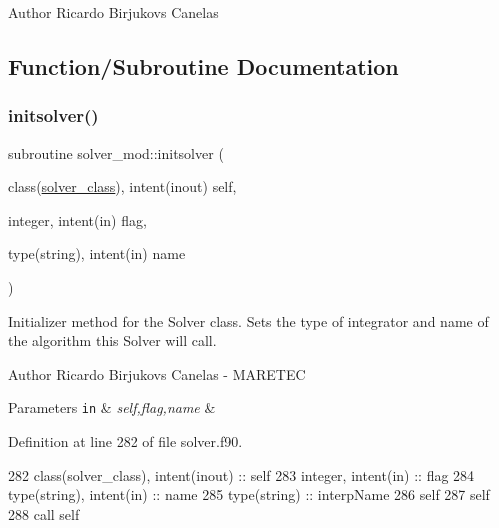 \begin{DoxyAuthor}{Author}
Ricardo Birjukovs Canelas 
\end{DoxyAuthor}


\subsection{Function/\+Subroutine Documentation}
\mbox{\label{namespacesolver__mod_a326292ff19880a914317109520b200b2}} 
\subsubsection{\texorpdfstring{initsolver()}{initsolver()}}
{\footnotesize\ttfamily subroutine solver\+\_\+mod\+::initsolver (\begin{DoxyParamCaption}\item[{class(\mbox{\hyperlink{structsolver__mod_1_1solver__class}{solver\+\_\+class}}), intent(inout)}]{self,  }\item[{integer, intent(in)}]{flag,  }\item[{type(string), intent(in)}]{name }\end{DoxyParamCaption})\hspace{0.3cm}{\ttfamily [private]}}



Initializer method for the Solver class. Sets the type of integrator and name of the algorithm this Solver will call. 

\begin{DoxyAuthor}{Author}
Ricardo Birjukovs Canelas -\/ M\+A\+R\+E\+T\+EC 
\end{DoxyAuthor}

\begin{DoxyParams}[1]{Parameters}
\mbox{\tt in}  & {\em self,flag,name} & \\
\hline
\end{DoxyParams}


Definition at line 282 of file solver.\+f90.


\begin{DoxyCode}
282     \textcolor{keywordtype}{class}(solver\_class), \textcolor{keywordtype}{intent(inout)} :: self
283     \textcolor{keywordtype}{integer}, \textcolor{keywordtype}{intent(in)} :: flag
284     \textcolor{keywordtype}{type}(string), \textcolor{keywordtype}{intent(in)} :: name
285     \textcolor{keywordtype}{type}(string) :: interpName
286     self%
287     self%
288     \textcolor{keyword}{call }self%
\end{DoxyCode}
\mbox{\label{namespacesolver__mod_a54ea6899cce026a7a5da2dd05922628f}} 
